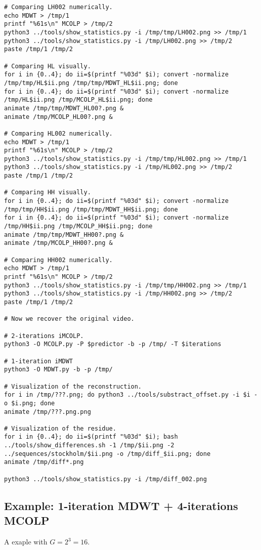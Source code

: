 \begin{verbatim}
# Comparing LH002 numerically.
echo MDWT > /tmp/1
printf "%61s\n" MCOLP > /tmp/2
python3 ../tools/show_statistics.py -i /tmp/tmp/LH002.png >> /tmp/1
python3 ../tools/show_statistics.py -i /tmp/LH002.png >> /tmp/2
paste /tmp/1 /tmp/2

# Comparing HL visually.
for i in {0..4}; do ii=$(printf "%03d" $i); convert -normalize /tmp/tmp/HL$ii.png /tmp/tmp/MDWT_HL$ii.png; done
for i in {0..4}; do ii=$(printf "%03d" $i); convert -normalize /tmp/HL$ii.png /tmp/MCOLP_HL$ii.png; done
animate /tmp/tmp/MDWT_HL00?.png &
animate /tmp/MCOLP_HL00?.png &

# Comparing HL002 numerically.
echo MDWT > /tmp/1
printf "%61s\n" MCOLP > /tmp/2
python3 ../tools/show_statistics.py -i /tmp/tmp/HL002.png >> /tmp/1
python3 ../tools/show_statistics.py -i /tmp/HL002.png >> /tmp/2
paste /tmp/1 /tmp/2

# Comparing HH visually.
for i in {0..4}; do ii=$(printf "%03d" $i); convert -normalize /tmp/tmp/HH$ii.png /tmp/tmp/MDWT_HH$ii.png; done
for i in {0..4}; do ii=$(printf "%03d" $i); convert -normalize /tmp/HH$ii.png /tmp/MCOLP_HH$ii.png; done
animate /tmp/tmp/MDWT_HH00?.png &
animate /tmp/MCOLP_HH00?.png &

# Comparing HH002 numerically.
echo MDWT > /tmp/1
printf "%61s\n" MCOLP > /tmp/2
python3 ../tools/show_statistics.py -i /tmp/tmp/HH002.png >> /tmp/1
python3 ../tools/show_statistics.py -i /tmp/HH002.png >> /tmp/2
paste /tmp/1 /tmp/2

# Now we recover the original video.

# 2-iterations iMCOLP.
python3 -O MCOLP.py -P $predictor -b -p /tmp/ -T $iterations

# 1-iteration iMDWT
python3 -O MDWT.py -b -p /tmp/

# Visualization of the reconstruction.
for i in /tmp/???.png; do python3 ../tools/substract_offset.py -i $i -o $i.png; done
animate /tmp/???.png.png

# Visualization of the residue.
for i in {0..4}; do ii=$(printf "%03d" $i); bash ../tools/show_differences.sh -1 /tmp/$ii.png -2 ../sequences/stockholm/$ii.png -o /tmp/diff_$ii.png; done
animate /tmp/diff*.png

python3 ../tools/show_statistics.py -i /tmp/diff_002.png
\end{verbatim}

\subsection*{Example: 1-iteration MDWT + 4-iterations MCOLP}
A exaple with $G=2^3=16$.

